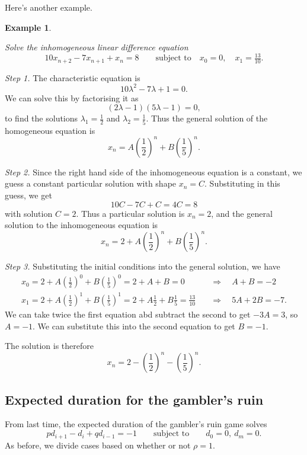 \documentclass[
  a4paper,
]{article}
\theoremstyle{definition}
\theoremstyle{definition}
\newtheorem{example}{Example}[section]
\theoremstyle{definition}
\theoremstyle{remark}
\begin{document}
Here's another example.

\begin{example}
\protect\hypertarget{exm:lde3}{}\label{exm:lde3}

\emph{Solve the inhomogeneous linear difference equation}
\[ 10 x_{n+2} - 7x_{n+1} + x_n = 8 \qquad \text{subject to} \quad x_0 = 0,\quad x_1 = \tfrac{13}{10} . \]

\emph{Step 1.} The characteristic equation is
\[ 10\lambda^2 - 7\lambda + 1 = 0 . \]
We can solve this by factorising it as
\[ (2\lambda - 1) (5\lambda - 1) = 0 , \]
to find the solutions \(\lambda_1 = \frac12\) and \(\lambda_2 = \frac15\). Thus the general solution of the homogeneous equation is
\[ x_n = A\left(\frac12\right)^n + B\left(\frac15\right)^n . \]

\emph{Step 2.} Since the right hand side of the inhomogeneous equation is a constant, we guess a constant particular solution with shape \(x_n = C\). Substituting in this guess, we get
\[ 10C - 7C + C = 4C = 8 \]
with solution \(C=2\). Thus a particular solution is \(x_n = 2\), and the general solution to the inhomogeneous equation is
\[ x_n = 2 + A\left(\frac12\right)^n + B\left(\frac15\right)^n . \]

\emph{Step 3.} Substituting the initial conditions into the general solution, we have
\begin{align*}
x_0 = 2 + A\left(\frac12\right)^0 + B\left(\frac15\right)^0 = 2 + A + B = 0 \quad &\Rightarrow \quad A + B = -2 \\
x_1 = 2 + A\left(\frac12\right)^1 + B\left(\frac15\right)^1 = 2 + A\frac12 + B\frac15 = \frac{13}{10} \quad &\Rightarrow \quad 5A + 2B = -7.
\end{align*}
We can take twice the first equation abd subtract the second to get \(-3A = 3\), so \(A = -1\). We can substitute this into the second equation to get \(B = -1\).

The solution is therefore
\[ x_n = 2 - \left(\frac12\right)^n - \left(\frac15\right)^n . \]

\end{example}

\hypertarget{duration-solve}{%
\subsection{Expected duration for the gambler's ruin}\label{duration-solve}}

From last time, the expected duration of the gambler's ruin game solves
\[ pd_{i+1} - d_i + qd_{i-1} = -1 \qquad \text{subject to} \qquad d_0 = 0,\ d_m = 0. \]
As before, we divide cases based on whether or not \(\rho = 1\).
\end{document}
